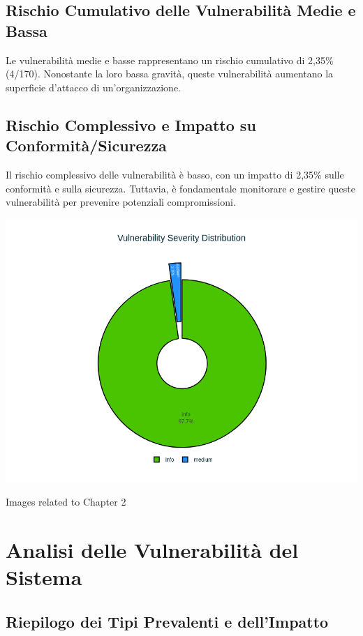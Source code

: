 \section{Rischio Cumulativo delle Vulnerabilità Medie e Bassa}

Le vulnerabilità medie e basse rappresentano un rischio cumulativo di 2,35\% (4/170). Nonostante la loro bassa gravità, queste vulnerabilità aumentano la superficie d'attacco di un'organizzazione.

\section{Rischio Complessivo e Impatto su Conformità/Sicurezza}

Il rischio complessivo delle vulnerabilità è basso, con un impatto di 2,35\% sulle conformità e sulla sicurezza. Tuttavia, è fondamentale monitorare e gestire queste vulnerabilità per prevenire potenziali compromissioni.


\begin{center}
\includegraphics[width=\linewidth]{pngs/1_1.png}
\vspace{1cm}\caption{Images related to Chapter 2}
\end{center}
\chapter{Analisi delle Vulnerabilità del Sistema}

\section{Riepilogo dei Tipi Prevalenti e dell'Impatto}

